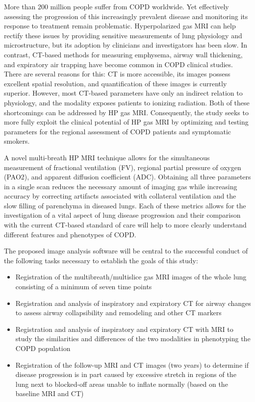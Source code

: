 \documentclass[11pt,]{article}
\providecommand{\tightlist}{%
  \setlength{\itemsep}{0pt}\setlength{\parskip}{0pt}}
\begin{document}
More than 200 million people suffer from COPD worldwide. Yet effectively
assessing the progression of this increasingly prevalent disease and
monitoring its response to treatment remain problematic. Hyperpolarized
gas MRI can help rectify these issues by providing sensitive
measurements of lung physiology and microstructure, but its adoption by
clinicians and investigators has been slow. In contrast, CT-based
methods for measuring emphysema, airway wall thickening, and expiratory
air trapping have become common in COPD clinical studies. There are
several reasons for this: CT is more accessible, its images possess
excellent spatial resolution, and quantification of these images is
currently superior. However, most CT-based parameters have only an
indirect relation to physiology, and the modality exposes patients to
ionizing radiation. Both of these shortcomings can be addressed by HP
gas MRI. Consequently, the study seeks to more fully exploit the
clinical potential of HP gas MRI by optimizing and testing parameters
for the regional assessment of COPD patients and symptomatic smokers.

A novel multi-breath HP MRI technique allows for the simultaneous
measurement of fractional ventilation (FV), regional partial pressure of
oxygen (PAO2), and apparent diffusion coefficient (ADC). Obtaining all
three parameters in a single scan reduces the necessary amount of
imaging gas while increasing accuracy by correcting artifacts associated
with collateral ventilation and the slow filling of parenchyma in
diseased lungs. Each of these metrics allows for the investigation of a
vital aspect of lung disease progression and their comparison with the
current CT-based standard of care will help to more clearly understand
different features and phenotypes of COPD.

The proposed image analysis software will be central to the successful
conduct of the following tasks necessary to establish the goals of this
study:

\begin{itemize}
\tightlist
\item
  Registration of the multibreath/multislice gas MRI images of the whole
  lung consisting of a minimum of seven time points
\item
  Registration and analysis of inspiratory and expiratory CT for airway
  changes to assess airway collapsibility and remodeling and other CT
  markers
\item
  Registration and analysis of inspiratory and expiratory CT with MRI to
  study the similarities and differences of the two modalities in
  phenotyping the COPD population
\item
  Registration of the follow-up MRI and CT images (two years) to
  determine if disease progression is in part caused by excessive
  stretch in regions of the lung next to blocked-off areas unable to
  inflate normally (based on the baseline MRI and CT)
\end{itemize}
\end{document}
